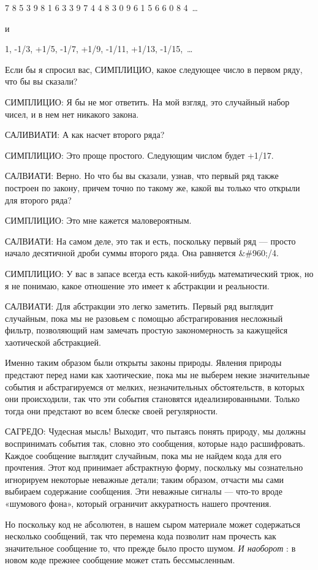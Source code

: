 \documentclass[../main.tex]{subfiles}
\begin{document}
7 8 5 3 9 8 1 6 3 3 9 7 4 4 8 3 0 9 6 1 5 6 6 0 8 4~\ldots{}

и

1, -1/3, +1/5, -1/7, +1/9, -1/11, +1/13, -1/15,~\ldots{}

Если бы я спросил вас, СИМПЛИЦИО, какое следующее число в первом ряду, что бы вы сказали?

СИМПЛИЦИО: Я бы не мог ответить. На мой взгляд, это случайный набор чисел, и в нем нет никакого закона.

САЛИВИАТИ: А как насчет второго ряда?

СИМПЛИЦИО: Это проще простого. Следующим числом будет +1/17.

САЛВИАТИ: Верно. Но что бы вы сказали, узнав, что первый ряд также построен по закону, причем точно по такому же, какой вы только что открыли для второго ряда?

СИМПЛИЦИО: Это мне кажется маловероятным.

САЛВИАТИ: На самом деле, это так и есть, поскольку первый ряд --- просто начало десятичной дроби суммы второго ряда. Она равняется \&\#960;/4.

СИМПЛИЦИО: У вас в запасе всегда есть какой-нибудь математический трюк, но я не понимаю, какое отношение это имеет к абстракции и реальности.

САЛВИАТИ: Для абстракции это легко заметить. Первый ряд выглядит случайным, пока мы не разовьем с помощью абстрагирования несложный фильтр, позволяющий нам замечать простую закономерность за кажущейся хаотической абстракцией.

Именно таким образом были открыты законы природы. Явления природы предстают перед нами как хаотические, пока мы не выберем некие значительные события и абстрагируемся от мелких, незначительных обстоятельств, в которых они происходили, так что эти события становятся идеализированными. Только тогда они предстают во всем блеске своей регулярности.

САГРЕДО: Чудесная мысль! Выходит, что пытаясь понять природу, мы должны воспринимать события так, словно это сообщения, которые надо расшифровать. Каждое сообщение выглядит случайным, пока мы не найдем кода для его прочтения. Этот код принимает абстрактную форму, поскольку мы сознательно игнорируем некоторые неважные детали; таким образом, отчасти мы сами выбираем содержание сообщения. Эти неважные сигналы --- что-то вроде «шумового фона», который ограничит аккуратность нашего прочтения.

Но поскольку код не абсолютен, в нашем сыром материале может содержаться несколько сообщений, так что перемена кода позволит нам прочесть как значительное сообщение то, что прежде было просто шумом. \emph{И наоборот} : в новом коде прежнее сообщение может стать бессмысленным.
\end{document}

